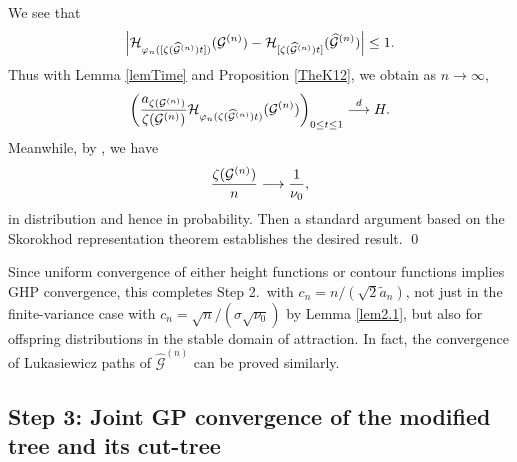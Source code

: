 \documentclass[11pt,a4paper]{article}
\newcommand{\cG}{\mathcal{G}}
\def\rar{\rightarrow}
\begin{document}
  We see that
$$
\left|{\cal H}_{  \varphi_n([\zeta( \widehat{{\cal G}}^{(n)}) t])}({\cal G}^{(n)})-{\cal H}_{  [\zeta( \widehat{{\cal G}}^{(n)} ) t]}( \widehat{{\cal G}}^{(n)}  )\right|\leq1.
$$
Thus with Lemma \ref{lemTime} and Proposition \ref{TheK12}, we obtain as $n\rar\infty$,
$$
\left(\frac{a_{\zeta( {\cal G}^{(n)} )}}{ \zeta( {\cal G}^{(n)} ) }{\cal H}_{  \varphi_n(\zeta( \widehat{{\cal G}}^{(n)}) t)}({\cal G}^{(n)})\right)_{0\leq t\leq 1}\overset{d}{\longrightarrow}H.
$$
Meanwhile, by \cite[Lemma 2.7]{Kor12}, we have
$$
\frac{\zeta({\cal G}^{(n)}) }{n}\longrightarrow \frac{1}{\nu_0},
$$
in distribution and hence in probability. Then a standard argument based on the Skorokhod representation theorem establishes the desired result. \qed

\bigskip

Since uniform convergence of either height functions or contour functions implies GHP convergence, this completes Step 2.\ with $c_n=n/(\sqrt{2}\widetilde{a}_n)$, not 
just in the finite-variance case with $c_n=\sqrt{n}/(\sigma\sqrt{\nu_0})$ by Lemma \ref{lem2.1}, but also for offspring distributions in the stable domain of attraction. 
In fact, the convergence of Lukasiewicz paths of $\widehat{\cG}^{(n)}$ can be proved similarly.


\subsection{Step 3: Joint GP convergence of the modified tree and its cut-tree}
\end{document}
